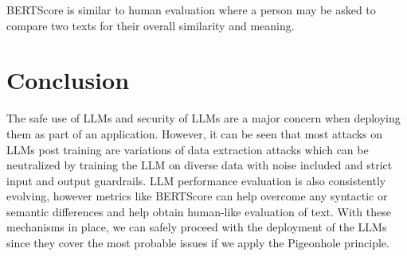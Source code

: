 \documentclass[12pt]{article}
\newcommand{\tab}{\hspace*{2em}} %
\begin{document}
\begin{itemize}
        BERTScore is similar to human evaluation where a person may be asked to compare two texts for their overall similarity and meaning.
    \end{itemize}


    \section{Conclusion}
    \tab The safe use of LLMs and security of LLMs are a major concern when deploying them as part of an application. However, it can be seen that most attacks on LLMs post training are variations of data extraction attacks which can be neutralized by training the LLM on diverse data with noise included and strict input and output guardrails.
    LLM performance evaluation is also consistently evolving, however metrics like BERTScore can help overcome any syntactic or semantic differences and help obtain human-like evaluation of text. With these mechanisms in place, we can safely proceed with the deployment of the LLMs since they cover the most probable issues if we apply the Pigeonhole principle.
\end{document}
